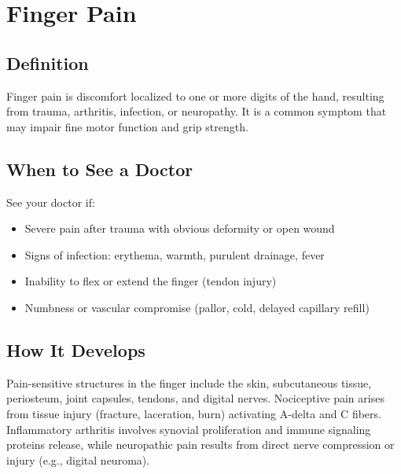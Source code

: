 \chapter{Finger Pain}

\section*{Definition}
Finger pain is discomfort localized to one or more digits of the hand, resulting from trauma, arthritis, infection, or neuropathy. It is a common symptom that may impair fine motor function and grip strength.

\section*{When to See a Doctor}
See your doctor if:
\begin{itemize}
  \item Severe pain after trauma with obvious deformity or open wound
  \item Signs of infection: erythema, warmth, purulent drainage, fever
  \item Inability to flex or extend the finger (tendon injury)
  \item Numbness or vascular compromise (pallor, cold, delayed capillary refill)
\end{itemize}

\section*{How It Develops}
Pain-sensitive structures in the finger include the skin, subcutaneous tissue, periosteum, joint capsules, tendons, and digital nerves. Nociceptive pain arises from tissue injury (fracture, laceration, burn) activating A-delta and C fibers. Inflammatory arthritis involves synovial proliferation and immune signaling proteins release, while neuropathic pain results from direct nerve compression or injury (e.g., digital neuroma).

